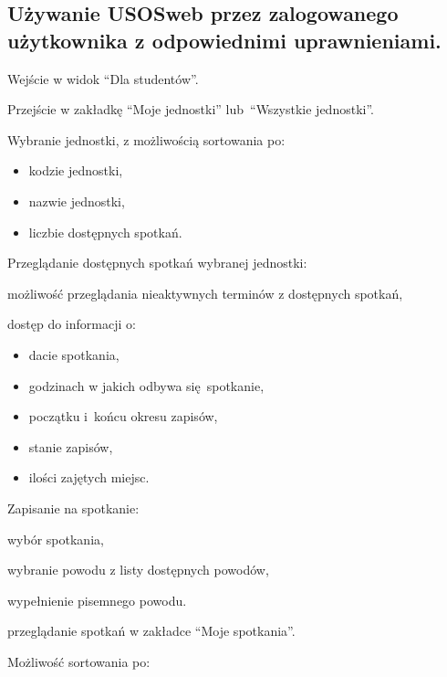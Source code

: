 \documentclass[licencjacka]{pracamgr}
\begin{document}
\subsection{Używanie USOSweb przez zalogowanego użytkownika z odpowiednimi uprawnieniami.}
	\begin{step}
			\item Wejście w widok \enquote{Dla studentów}.
			\item Przejście w zakładkę \enquote{Moje jednostki} lub~\enquote{Wszystkie jednostki}.
			\item Wybranie jednostki, z możliwością sortowania po:
				\begin{itemize}
					\item kodzie jednostki,
					\item nazwie jednostki,
					\item liczbie dostępnych spotkań. 
				\end{itemize}
			\item Przeglądanie dostępnych spotkań wybranej jednostki:
				\begin{step}
					\item możliwość przeglądania nieaktywnych terminów z dostępnych spotkań,
					\item dostęp do informacji o:
						\begin{itemize}
							\item dacie spotkania,
							\item godzinach w jakich odbywa się~spotkanie,
							\item początku i~końcu okresu zapisów,
							\item stanie zapisów,
							\item ilości zajętych miejsc.
						\end{itemize}
				\end{step}
			\item Zapisanie na spotkanie:
				\begin{step}
					\item wybór spotkania,
					\item wybranie powodu z listy dostępnych powodów,
					\item wypełnienie pisemnego powodu.
				\end{step}
			\item przeglądanie spotkań w zakładce \enquote{Moje spotkania}.
				\begin{step}
					\item Możliwość sortowania po:
						\begin{itemize}

\end{itemize}
\end{step}
\end{step}
\end{document}
